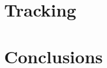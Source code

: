 \documentclass{article}
\begin{document}
\section{Tracking}
\label{sec:tracking}


\clearpage
\section{Conclusions}
\label{sec:conclusions}


\end{document}
